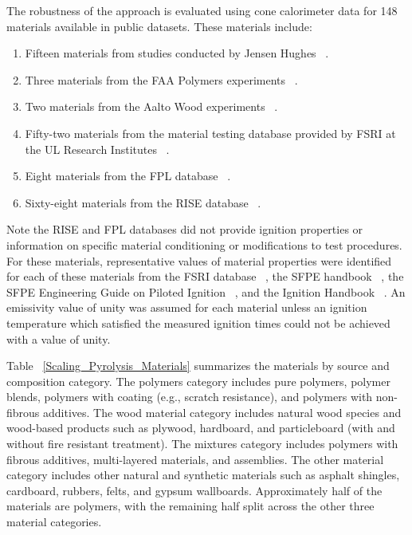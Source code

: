 The robustness of the approach is evaluated using cone calorimeter data for 148 materials available in public datasets.
These materials include:
\begin{enumerate}
\item Fifteen materials from studies conducted by Jensen Hughes ~\cite{Luo:FRA2019,Lattimer:NIJ19}.
\item Three materials from the FAA Polymers experiments ~\cite{Stoliarov:CF2009,Stoliarov:FM2012}.
\item Two materials from the Aalto Wood experiments ~\cite{Rinta-Paavola:2023}.
\item Fifty-two materials from the material testing database provided by FSRI at the UL Research Institutes ~\cite{McKinnon:FSRI2023_Data}.
\item Eight materials from the FPL database ~\cite{FPL:Fire_Database}.
\item Sixty-eight materials from the RISE database ~\cite{RISE:Fire_Database}.
\end{enumerate}
Note the RISE and FPL databases did not provide ignition properties or information on specific material conditioning or modifications to test procedures.
For these materials, representative values of material properties were identified for each of these materials from the FSRI database ~\cite{McKinnon:FSRI2023_Data}, the SFPE handbook ~\cite{SFPE:Tewarson},
the SFPE Engineering Guide on Piloted Ignition ~\cite{Beyler2002}, and the Ignition Handbook ~\cite{Babrauskas:2}.
An emissivity value of unity was assumed for each material unless an ignition temperature which satisfied the measured ignition times could not be achieved with a value of unity.

Table ~\ref{Scaling_Pyrolysis_Materials} summarizes the materials by source and composition category.
The polymers category includes pure polymers, polymer blends, polymers with coating (e.g., scratch resistance), and polymers with non-fibrous additives.
The wood material category includes natural wood species and wood-based products such as plywood, hardboard, and particleboard (with and without fire resistant treatment).
The mixtures category includes polymers with fibrous additives, multi-layered materials, and assemblies.
The other material category includes other natural and synthetic materials such as asphalt shingles, cardboard, rubbers, felts, and gypsum wallboards.
Approximately half of the materials are polymers, with the remaining half split across the other three material categories.

